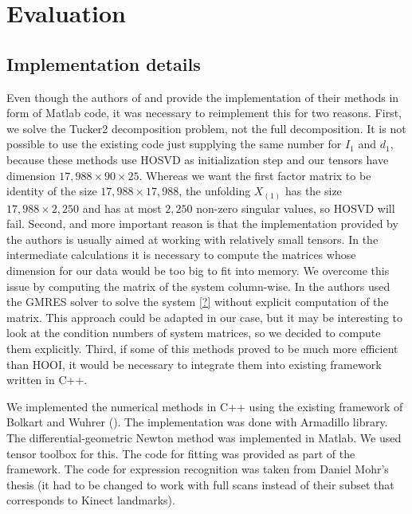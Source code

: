 \chapter{Evaluation}




\section{Implementation details}


Even though the authors of \cite{elden_savas_2007}
and \cite{IDLAVH09} provide the implementation 
of their methods in form of Matlab code,
it was necessary to reimplement this for two reasons.
First, we solve the Tucker2 decomposition problem, not the
full decomposition. It is not possible to use the existing 
code just supplying the same number for $I_1$
and $d_1$, because these methods use HOSVD as initialization step
and our tensors have dimension $17,988 \times 90 \times 25$.
Whereas we want the first factor matrix to be identity of the size
$17,988 \times 17,988$, the unfolding $X_{(1)}$ has the size
$17,988 \times 2,250$ and has at most $2,250$ 
non-zero singular values, so HOSVD will fail.
Second, and more important reason is that the implementation
provided by the authors is usually aimed at working
with relatively small tensors. In the intermediate calculations
it is necessary to compute the matrices whose
dimension for our data would be too big to fit into memory.
We overcome this issue by computing the matrix of the 
system column-wise. In \cite{IDLAVH09} the authors
used the GMRES solver to solve the system \ref{?} without
explicit computation of the matrix. This approach could
be adapted in our case, but it may be interesting
to look at the condition numbers of system matrices, 
so we decided to compute them explicitly.
Third, if some of this methods proved to be much more
efficient than HOOI, it would be necessary to integrate 
them into existing framework written in C++.

We  implemented the numerical methods in C++ using the existing framework 
of Bolkart and Wuhrer (\cite{bolkart_wuhrer_2013}).
The implementation was done with Armadillo library.
The differential-geometric Newton method was implemented in Matlab. 
We used tensor toolbox for this.
The code for fitting was provided as part of the framework. The code for 
expression recognition was taken from Daniel Mohr's thesis
(it had to be changed to work with full scans instead of their subset
that corresponds to Kinect landmarks).



